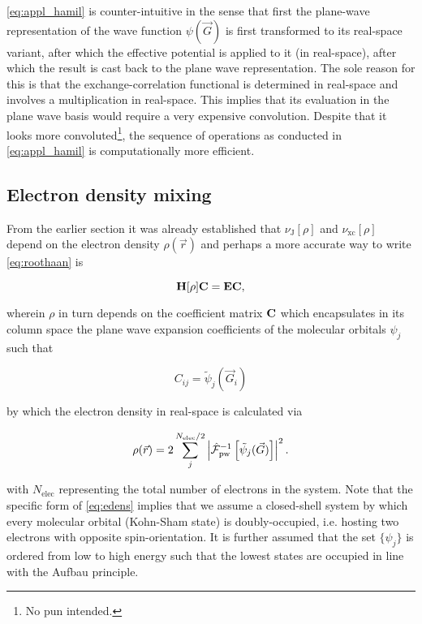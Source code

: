 \cref{eq:appl_hamil} is counter-intuitive in the sense that first the plane-wave representation of the wave function $\psi(\vec{G})$ is first transformed to its real-space variant, after which the effective potential is applied to it (in real-space), after which the result is cast back to the plane wave representation. The sole reason for this is that the exchange-correlation functional is determined in real-space and involves a multiplication in real-space. This implies that its evaluation in the plane wave basis would require a very expensive convolution. Despite that it looks more convoluted\footnote{No pun intended.}, the sequence of operations as conducted in \cref{eq:appl_hamil} is computationally more efficient.

%
%
%
\subsection{Electron density mixing}

From the earlier section it was already established that $\nu_{\text{J}}[\rho]$ and $\nu_{\text{xc}}[\rho]$ depend on the electron density $\rho(\vec{r})$ and perhaps a more accurate way to write \cref{eq:roothaan} is

\begin{equation}
    \mathbf{H}[\rho]\mathbf{C} = \mathbf{E}\mathbf{C},
    \label{eq:roothaan_explicit}
\end{equation}

wherein $\rho$ in turn depends on the coefficient matrix $\mathbf{C}$ which encapsulates in its column space the plane wave expansion coefficients of the molecular orbitals $\psi_{j}$ such that

\begin{equation}
    C_{ij} = \tilde{\psi}_{j}(\vec{G}_{i})
\end{equation}

by which the electron density in real-space is calculated via

\begin{equation}
    \rho(\vec{r}) = 2\sum_{j}^{N_{\text{elec}} / 2} \left|\hat{\mathcal{F}}_{\text{pw}}^{-1} \left[ \tilde{\psi}_{j}(\vec{G}) \right] \right|^{2}.
    \label{eq:edens}
\end{equation}

with $N_{\text{elec}}$ representing the total number of electrons in the system. Note that the specific form of \cref{eq:edens} implies that we assume a closed-shell system by which every molecular orbital (Kohn-Sham state) is doubly-occupied, i.e. hosting two electrons with opposite spin-orientation. It is further assumed that the set $\{ \psi_{j} \}$ is ordered from low to high energy such that the lowest states are occupied in line with the Aufbau principle.


